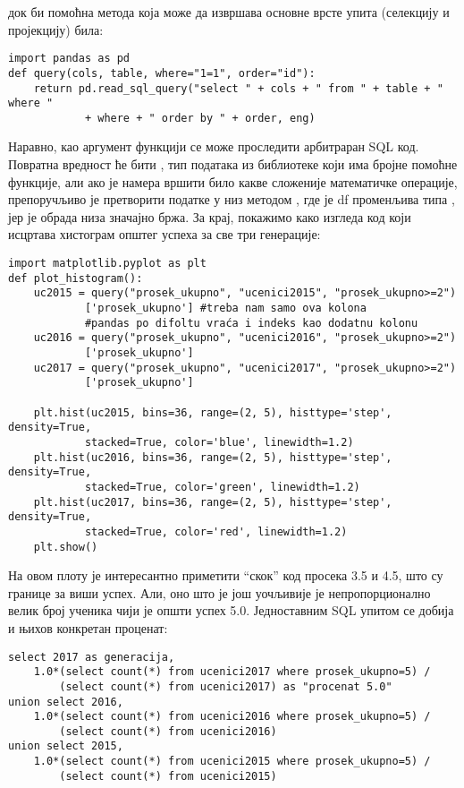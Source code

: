 док би помоћна метода која може да извршава основне врсте упита (селекцију и пројекцију) била:

\begin{verbatim}
import pandas as pd
def query(cols, table, where="1=1", order="id"):
    return pd.read_sql_query("select " + cols + " from " + table + " where " 
            + where + " order by " + order, eng)
\end{verbatim}

Наравно, као аргумент  функцији се може проследити арбитраран SQL код. Повратна вредност ће бити , тип података из  библиотеке који има бројне помоћне функције, али ако је намера вршити било какве сложеније математичке операције, препоручљиво је претворити податке у  низ методом , где је df променљива типа , јер је обрада низа значајно бржа. За крај, покажимо како изгледа код који исцртава хистограм општег успеха за све три генерације:

\begin{verbatim}
import matplotlib.pyplot as plt
def plot_histogram():
    uc2015 = query("prosek_ukupno", "ucenici2015", "prosek_ukupno>=2")
            ['prosek_ukupno'] #treba nam samo ova kolona
            #pandas po difoltu vraća i indeks kao dodatnu kolonu
    uc2016 = query("prosek_ukupno", "ucenici2016", "prosek_ukupno>=2")
            ['prosek_ukupno']
    uc2017 = query("prosek_ukupno", "ucenici2017", "prosek_ukupno>=2")
            ['prosek_ukupno']

    plt.hist(uc2015, bins=36, range=(2, 5), histtype='step', density=True, 
            stacked=True, color='blue', linewidth=1.2)
    plt.hist(uc2016, bins=36, range=(2, 5), histtype='step', density=True, 
            stacked=True, color='green', linewidth=1.2)
    plt.hist(uc2017, bins=36, range=(2, 5), histtype='step', density=True, 
            stacked=True, color='red', linewidth=1.2)
    plt.show()
\end{verbatim}

На овом плоту је интересантно приметити \enquote{скок} код просека 3.5 и 4.5, што су границе за виши успех. Али, оно што је још уочљивије је непропорционално велик број ученика чији је општи успех 5.0. Једноставним SQL упитом се добија и њихов конкретан проценат:

\begin{verbatim}
select 2017 as generacija, 
    1.0*(select count(*) from ucenici2017 where prosek_ukupno=5) /
        (select count(*) from ucenici2017) as "procenat 5.0" 
union select 2016, 
    1.0*(select count(*) from ucenici2016 where prosek_ukupno=5) /
        (select count(*) from ucenici2016) 
union select 2015, 
    1.0*(select count(*) from ucenici2015 where prosek_ukupno=5) /
        (select count(*) from ucenici2015)
\end{verbatim}

